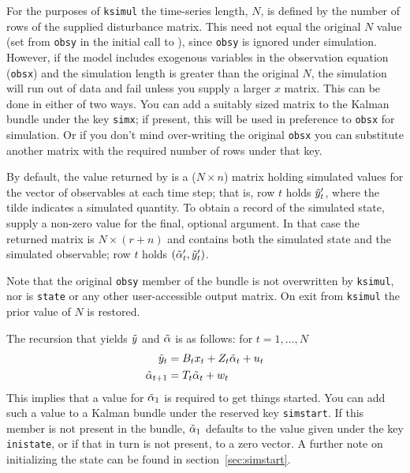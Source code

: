For the purposes of \texttt{ksimul} the time-series length, $N$, is
defined by the number of rows of the supplied disturbance matrix. This
need not equal the original $N$ value (set from \texttt{obsy} in the
initial call to ), since \texttt{obsy} is ignored under
simulation. However, if the model includes exogenous variables in the
observation equation (\texttt{obsx}) and the simulation length is
greater than the original $N$, the simulation will run out of data and
fail unless you supply a larger $x$ matrix.  This can be done in
either of two ways. You can add a suitably sized matrix to the Kalman
bundle under the key \texttt{simx}; if present, this will be used in
preference to \texttt{obsx} for simulation. Or if you don't mind
over-writing the original \texttt{obsx} you can substitute another
matrix with the required number of rows under that key.

By default, the value returned by  is a ($N \times n$)
matrix holding simulated values for the vector of observables at each
time step; that is, row $t$ holds $\tilde{y}_t'$, where the tilde
indicates a simulated quantity.  To obtain a record of the simulated
state, supply a non-zero value for the final, optional argument. In
that case the returned matrix is $N \times (r+n)$ and contains both
the simulated state and the simulated observable; row $t$ holds
$(\tilde{\alpha}_t', \tilde{y}_t')$.

Note that the original \texttt{obsy} member of the bundle is not
overwritten by \texttt{ksimul}, nor is \texttt{state} or any other
user-accessible output matrix. On exit from \texttt{ksimul} the prior
value of $N$ is restored.

The recursion that yields $\tilde{y}$ and $\tilde{\alpha}$
is as follows: for $t=1,\dots,N$
%
\begin{align*}
  \tilde{y}_t &= B_tx_t +
   Z_t \tilde{\alpha}_t + u_t  \\
  \tilde{\alpha}_{t+1} &= T_t \tilde{\alpha}_t + w_t
\end{align*}
%
This implies that a value for $\tilde{\alpha}_1$ is required to get
things started. You can add such a value to a Kalman bundle under the
reserved key \texttt{simstart}. If this member is not present in the
bundle, $\tilde{\alpha}_1$ defaults to the value given under the
key \texttt{inistate}, or if that in turn is not present, to a zero
vector. A further note on initializing the state can be found in
section~\ref{sec:simstart}.

